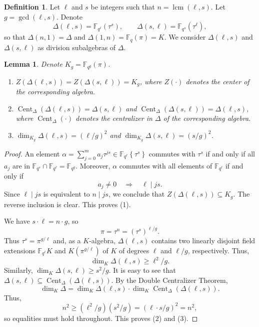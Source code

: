 \documentclass[12pt]{amsart}
\newtheorem{lem}[thm]{Lemma}
\theoremstyle{definition}
\newtheorem{defn}[thm]{Definition}
\theoremstyle{remark}
\numberwithin{equation}{section}
\numberwithin{thm}{section}
\DeclareMathOperator{\Cent}{Cent}
\DeclareMathOperator{\lcm}{lcm}
\newcommand{\F}{\mathbb{F}}
\newcommand{\twistt}[2]{#1\!\left\{#2\right\}}
\begin{document}
\begin{defn}
Let $\ell$  and $s$ be integers such that $n=\lcm(\ell, s)$. Let $g=\gcd(\ell,s)$. Denote 
$$
\Delta(\ell, s)=\F_{q^\ell}(\tau^s), \qquad \Delta(s, \ell)=\F_{q^s}(\tau^\ell), 
$$
so that $\Delta(n, 1)=\Delta$ and $\Delta(1, n)=\F_q(\pi)=K$. 
We consider $\Delta(\ell, s)$ and $\Delta(s, \ell)$ as division subalgebras of $\Delta$. 
\end{defn}

\begin{lem} Denote $K_g=\F_{q^g}(\pi)$. 
	\begin{enumerate}
		\item $Z(\Delta(\ell, s))=Z(\Delta(s,\ell))=K_g$, where $Z(\cdot)$ denotes the center of the corresponding algebra. 
		\item $\Cent_\Delta(\Delta(\ell, s))=\Delta(s, \ell)$ and $\Cent_\Delta(\Delta(s,  \ell))=\Delta(\ell, s)$, where $\Cent_\Delta(\cdot)$ denotes the centralizer in $\Delta$ 
		of the corresponding algebra. 
		\item $\dim_{K_g} \Delta(\ell, s) =(\ell/g)^2$ and $\dim_{K_g} \Delta(s, \ell) =(s/g)^2$. 
	\end{enumerate}
\end{lem}
\begin{proof} An element $\alpha=\sum_{j=0}^m a_j \tau^{j s}\in \twistt{\F_{q^\ell}}{\tau^s}$ commutes with $\tau^s$ if and only if all $a_j$ are in $\F_{q^s}\cap \F_{q^\ell}=\F_{q^g}$. Moreover, $\alpha$ commutes with all elements of $\F_{q^\ell}$ if and only if 
	$$a_j\neq 0\quad  \Longrightarrow \quad \ell \mid js. 
	$$
	Since $\ell \mid js$ is equivalent to $n\mid js$, we conclude that $Z(\Delta(\ell, s))\subseteq K_g$. The reverse inclusion is clear. This proves (1). 
	
	We have $s\cdot \ell = n\cdot g$, so 
	$$\pi=\tau^n = (\tau^s)^{\ell/g}. 
	$$
	Thus $\tau^s=\pi^{g/\ell}$ and, as a $K$-algebra, $\Delta(\ell, s)$ contains two linearly disjoint field extensions $\F_{q^\ell}K$ and $K(\pi^{g/\ell})$ of $K$ 
	of degrees $\ell$ and $\ell/g$, respectively. Thus, 
	$$
	\dim_K \Delta(\ell, s)\geq \ell^2/g. 
	$$
	Similarly, $\dim_K \Delta(s, \ell)\geq s^2/g$. It is easy to see that $\Delta(s, \ell)\subseteq \Cent_\Delta(\Delta(\ell, s))$. By the Double Centralizer Theorem, 
	$$
	\dim_K \Delta = \dim_K \Delta(\ell, s)\cdot \dim_K 	\Cent_\Delta(\Delta(\ell, s)). 
	$$
	Thus,
	$$
	n^2\geq ( \ell^2/g) ( s^2/g) = (\ell\cdot s/g)^2=n^2,
	$$
	so equalities must hold throughout. This proves (2) and (3). 
\end{proof}
\end{document}
